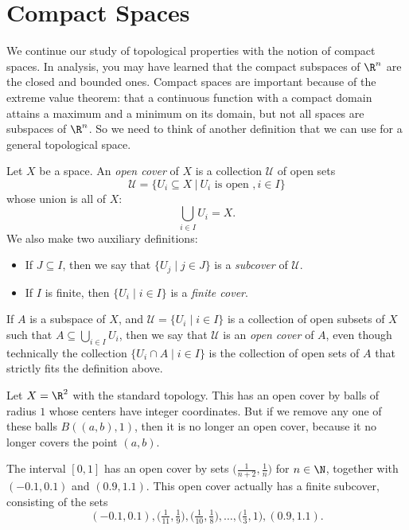 \documentclass[noname]{notes}
\begin{document}
\section{Compact Spaces}

We continue our study of topological properties with the notion of compact spaces. In analysis, you may have learned that the compact subspaces of $\R^n$ are the closed and bounded ones. Compact spaces are important because of the extreme value theorem: that a continuous function with a compact domain attains a maximum and a minimum on its domain, but not all spaces are subspaces of $\R^n$. So we need to think of another definition that we can use for a general topological space. 

\begin{definition}
	Let $X$ be a space. An \emph{open cover} of $X$ is a collection $\mathcal{U}$ of open sets 
	\[
		\mathcal U = \Big\{U_i \subseteq X\ \Big\vert\ U_i \text{ is open }, i \in I\Big\}
	\]
	whose union is all of $X$: 
	\[
		\bigcup_{i \in I} U_i = X. 
	\]
	We also make two auxiliary definitions:
	\begin{itemize}
		\item If $J \subseteq I$, then we say that $\{U_j \mid j \in J\}$ is a \emph{subcover} of $\mathcal{U}$. 
		\item If $I$ is finite, then $\{U_i \mid i \in I\}$ is a \emph{finite cover}. 
	\end{itemize}
\end{definition}

\begin{remark}
	If $A$ is a subspace of $X$, and $\mathcal{U} = \{U_i \mid i \in I\}$ is a collection of open subsets of $X$ such that $A \subseteq \bigcup_{i \in I} U_i$, then we say that $\mathcal{U}$ is an \emph{open cover} of $A$, even though technically the collection $\{U_i \cap A \mid i \in I\}$ is the collection of open sets of $A$ that strictly fits the definition above. 
\end{remark}

\begin{example}
	Let $X = \R^2$ with the standard topology. This has an open cover by balls of radius $1$ whose centers have integer coordinates. But if we remove any one of these balls $B((a,b),1)$, then it is no longer an open cover, because it no longer covers the point $(a,b)$. 
\end{example}

\begin{example}
	The interval $[0,1]$ has an open cover by sets $\big(\frac{1}{n+2},\frac{1}{n}\big)$ for $n \in \N$, together with $(-0.1,0.1)$ and $(0.9,1.1)$. This open cover actually has a finite subcover, consisting of the sets 
	\[
		(-0.1,0.1), \big(\tfrac{1}{11},\tfrac{1}{9}\big), \big(\tfrac{1}{10},\tfrac{1}{8}\big), \ldots, \big(\tfrac{1}{3},1\big), (0.9,1.1).
	\]
\end{example}
\end{document}

